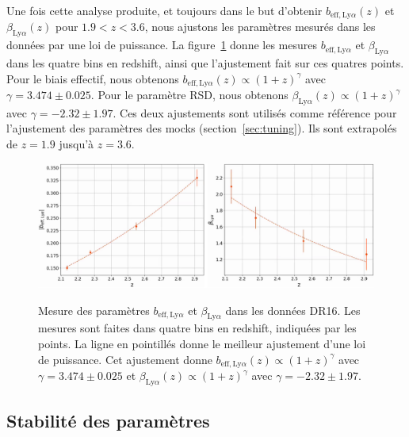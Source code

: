 \documentclass[11pt, twoside, a4paper, openright]{report}
\begin{document}
Une fois cette analyse produite, et toujours dans le but d'obtenir $b_{\mathrm{eff},\mathrm{Ly}\alpha}(z)$ et $\beta_{\mathrm{Ly}\alpha}(z)$ pour $\num{1.9} < z  < \num{3.6}$, nous ajustons les paramètres \lya{} mesurés dans les données par une loi de puissance. La figure~\ref{fig:bias_vs_z} donne les mesures $b_{\mathrm{eff},\mathrm{Ly}\alpha}$ et $\beta_{\mathrm{Ly}\alpha}$ dans les quatre bins en redshift, ainsi que l'ajustement fait sur ces quatres points. Pour le biais effectif, nous obtenons $b_{\mathrm{eff},\mathrm{Ly}\alpha}(z) \propto (1+z)^{\gamma}$ avec $\gamma = \num{3.474} \pm \num{0.025}$. Pour le paramètre RSD, nous obtenons $\beta_{\mathrm{Ly}\alpha}(z) \propto (1+z)^{\gamma}$ avec $\gamma = - \num{2.32} \pm \num{1.97}$. Ces deux ajustements sont utilisés comme référence pour l'ajustement des paramètres des mocks (section~\ref{sec:tuning}). Ils sont extrapolés de $z = \num{1.9}$ jusqu'à $z = \num{3.6}$.
\begin{figure}
  \centering
  \includegraphics[scale=0.44]{bias_vs_z}
  \label{fig:bias_vs_z}
  \caption{Mesure des paramètres $b_{\mathrm{eff},\mathrm{Ly}\alpha}$ et $\beta_{\mathrm{Ly}\alpha}$ dans les données DR16. Les mesures sont faites dans quatre bins en redshift, indiquées par les points. La ligne en pointillés donne le meilleur ajustement d'une loi de puissance. Cet ajustement donne $b_{\mathrm{eff},\mathrm{Ly}\alpha}(z) \propto (1+z)^{\gamma}$ avec $\gamma = \num{3.474} \pm \num{0.025}$ et $\beta_{\mathrm{Ly}\alpha}(z) \propto (1+z)^{\gamma}$ avec $\gamma = - \num{2.32} \pm \num{1.97}$.}
\end{figure}





\subsection{Stabilité des paramètres \lya{}}
\label{subsec:stab_pars_lya}
\end{document}
